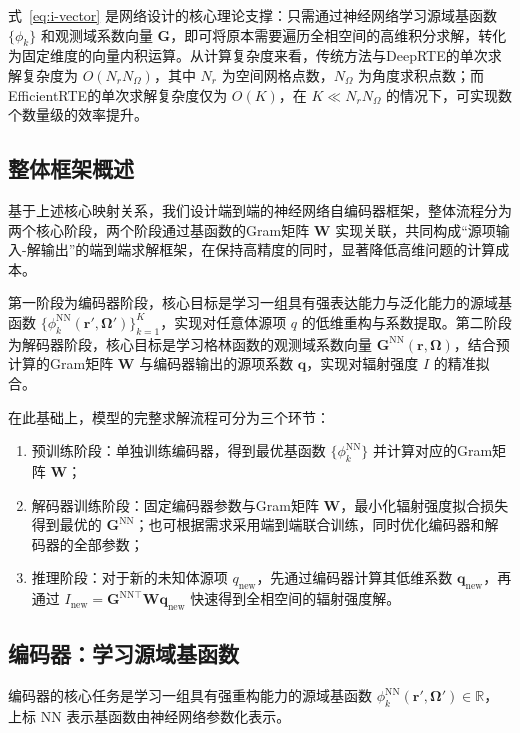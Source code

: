式~\eqref{eq:i-vector} 是网络设计的核心理论支撑：只需通过神经网络学习源域基函数 $\{\phi_k\}$ 和观测域系数向量 $\boldsymbol{G}$，即可将原本需要遍历全相空间的高维积分求解，转化为固定维度的向量内积运算。从计算复杂度来看，传统方法与DeepRTE的单次求解复杂度为 $O(N_r N_\Omega)$，其中 $N_r$ 为空间网格点数，$N_\Omega$ 为角度求积点数；而EfficientRTE的单次求解复杂度仅为 $O(K)$，在 $K \ll N_r N_\Omega$ 的情况下，可实现数个数量级的效率提升。

\subsection{整体框架概述}
基于上述核心映射关系，我们设计端到端的神经网络自编码器框架，整体流程分为两个核心阶段，两个阶段通过基函数的Gram矩阵 $\boldsymbol{W}$ 实现关联，共同构成“源项输入-解输出”的端到端求解框架，在保持高精度的同时，显著降低高维问题的计算成本。

第一阶段为编码器阶段，核心目标是学习一组具有强表达能力与泛化能力的源域基函数 $\{\phi_k^{\text{NN}}(\boldsymbol{r}',\boldsymbol{\Omega}')\}_{k=1}^K$，实现对任意体源项 $q$ 的低维重构与系数提取。第二阶段为解码器阶段，核心目标是学习格林函数的观测域系数向量 $\boldsymbol{G}^{\text{NN}}(\boldsymbol{r},\boldsymbol{\Omega})$，结合预计算的Gram矩阵 $\boldsymbol{W}$ 与编码器输出的源项系数 $\boldsymbol{q}$，实现对辐射强度 $I$ 的精准拟合。

在此基础上，模型的完整求解流程可分为三个环节：
\begin{enumerate}
    \item 预训练阶段：单独训练编码器，得到最优基函数 $\{\phi_k^{\text{NN}}\}$ 并计算对应的Gram矩阵 $\boldsymbol{W}$；
    \item 解码器训练阶段：固定编码器参数与Gram矩阵 $\boldsymbol{W}$，最小化辐射强度拟合损失得到最优的 $\boldsymbol{G}^{\text{NN}}$；也可根据需求采用端到端联合训练，同时优化编码器和解码器的全部参数；
    \item 推理阶段：对于新的未知体源项 $q_{\text{new}}$，先通过编码器计算其低维系数 $\boldsymbol{q}_{\text{new}}$，再通过 $I_{\text{new}} = \boldsymbol{G}^{\text{NN}\top} \boldsymbol{W} \boldsymbol{q}_{\text{new}}$ 快速得到全相空间的辐射强度解。
\end{enumerate}

\subsection{编码器：学习源域基函数}\label{sec:prte-encoder}
编码器的核心任务是学习一组具有强重构能力的源域基函数 $\phi_k^{\text{NN}}(\boldsymbol{r}',\boldsymbol{\Omega}')\in\mathbb{R}$，上标 $\text{NN}$ 表示基函数由神经网络参数化表示。

